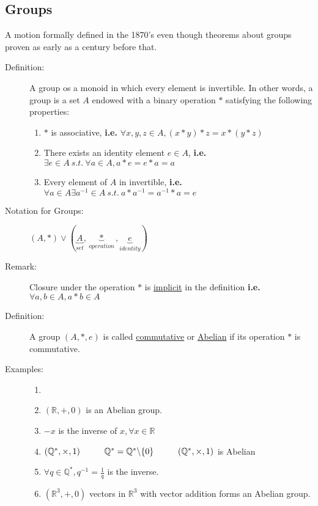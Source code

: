 \documentclass[10pt]{article}
\begin{document}
	\subsection{Groups}
	A motion formally defined in the 1870's even though theorems about groups proven as early as a century before that.
	\begin{description}
		\item[Definition:] A group os a monoid in which every element is invertible. In other words, a group is a set $A$ endowed with a binary operation $*$ satisfying the following properties:
		\begin{enumerate}
			\item $*$ is associative, \textbf{i.e.} $\forall x, y, z \in A, (x*y)*z = x*(y*z)$
			\item There exists an identity element $e \in A$, \textbf{i.e.} $\exists e \in A \: s.t. \: \forall a \in A, a*e = e*a = a$
			\item Every element of $A$ in invertible, \textbf{i.e.} $\forall a \in A \exists a^{-1} \in A \: s.t. \: a * a^{-1} = a^{-1} * a = e$
		\end{enumerate}
		\item[Notation for Groups:] $(A, *) \lor (\underset{set}{\underbrace{A}}, \underset{operation}{\underbrace{*}}, \underset{identity}{\underbrace{e}})$
		\item[Remark:] Closure under the operation $*$ is \underline{implicit} in the definition \textbf{i.e.} $\forall a, b \in A, a * b \in A$
		\item[Definition:] A group $(A, *, e)$ is called \underline{commutative} or \underline{Abelian} if its operation $*$ is commutative.
		\item[Examples:]
		\begin{enumerate}
			\item[]
			\item $(\mathbb{R}, +, 0)$ is an Abelian group.
			\item[] $-x$ is the inverse of $x, \forall x \in \mathbb{R}$
			\item $(\mathbb{Q}^*, \times, 1) \hspace{10mm} \mathbb{Q}^* = \mathbb{Q}^*\backslash\{0\} \hspace{10mm} (\mathbb{Q}^*, \times, 1)$ is Abelian
			\item[] $\forall q \in \mathbb{Q}^*, q^{-1} = \frac{1}{q}$ is the inverse.
			\item $(\mathbb{R}^3, +, 0)$ vectors in $\mathbb{R}^3$ with vector addition forms an Abelian group.

\end{enumerate}
\end{description}
\end{document}
